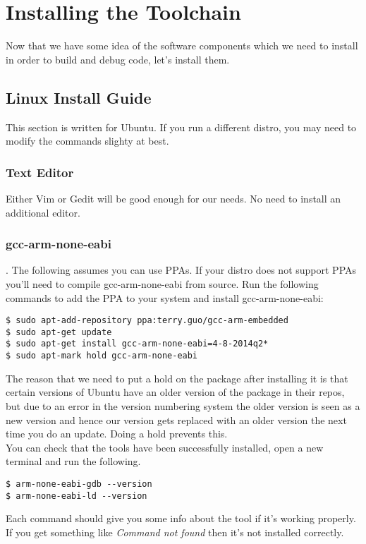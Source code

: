 \chapter{Installing the Toolchain}
Now that we have some idea of the software components which we need to install in order to build and debug code, let's install them.

\section{Linux Install Guide}
This section is written for Ubuntu. If you run a different distro, you may need to modify the commands slighty at best.
\subsection{Text Editor}
Either Vim or Gedit will be good enough for our needs. No need to install an additional editor.

\subsection{gcc-arm-none-eabi}.
The following assumes you can use PPAs. If your distro does not support PPAs you'll need to compile gcc-arm-none-eabi from source.
Run the following commands to add the PPA to your system and install gcc-arm-none-eabi:
\begin{lstlisting}[style=BashStyle]
$ sudo apt-add-repository ppa:terry.guo/gcc-arm-embedded
$ sudo apt-get update
$ sudo apt-get install gcc-arm-none-eabi=4-8-2014q2*
$ sudo apt-mark hold gcc-arm-none-eabi
\end{lstlisting}
The reason that we need to put a hold on the package after installing it is that certain versions of Ubuntu have an older version of the package in their repos, but due to an error in the version numbering system the older version is seen as a new version and hence our version gets replaced with an older version the next time you do an update. Doing a hold prevents this. \\

You can check that the tools have been successfully installed, open a new terminal and run the following. 
\begin{lstlisting}[style=BashStyle]
$ arm-none-eabi-gdb --version
$ arm-none-eabi-ld --version
\end{lstlisting}
Each command should give you some info about the tool if it's working properly. If you get something like \textit{Command not found} then it's not installed correctly.

